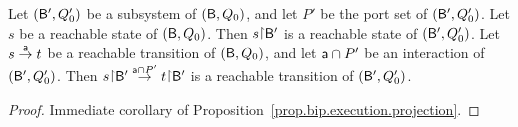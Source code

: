 \begin{corollary} \label{cor.bip.reachability} \label{cor:bip.reachability}
Let $(\mathsf{B}', Q'_0)$ be a subsystem of $(\mathsf{B}, Q_0)$, and let $P'$ be the port set of $(\mathsf{B}', Q'_0)$.
Let $s$ be a reachable state of $(\mathsf{B}, Q_0)$. Then $s \pj \B'$ is a reachable state of  $(\mathsf{B}',Q'_0)$. Let $s \stackrel{\mathsf{a}}{\rightarrow} t$ be
a reachable transition of $(\mathsf{B}, Q_0)$, and let $\mathsf{a} \cap P'$ be an interaction of
 $(\mathsf{B}', Q'_0)$. Then  $s \pj \B' \la{\act \ints P'} t \pj \B'$ is a reachable transition of $(\mathsf{B}', Q'_0)$.
\end{corollary}
%
\begin{proof}
Immediate corollary of Proposition~\ref{prop.bip.execution.projection}.
\end{proof}






